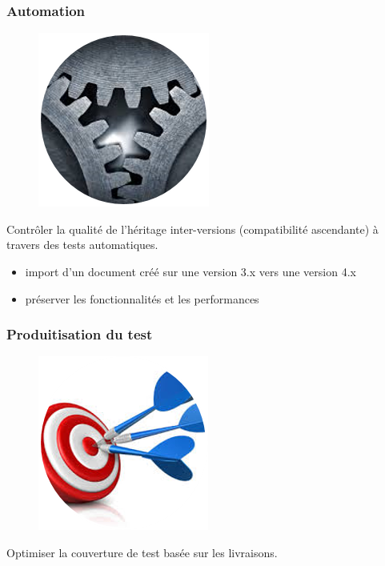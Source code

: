 \subsubsection{Automation}
\begin{figure}[H]
  \centering
      \includegraphics{images/automation.png}
\end{figure}
Contrôler la qualité de l'héritage inter-versions (compatibilité ascendante) à travers des tests automatiques.\\
\begin{itemize}
	\item import d'un document créé sur une version 3.x vers une version 4.x
	\item préserver les fonctionnalités et les performances
\end{itemize}

\subsubsection{Produitisation du test}
\begin{figure}[H]
  \centering
      \includegraphics{images/produitisation.png}
\end{figure}
Optimiser la couverture de test basée sur les livraisons. 

